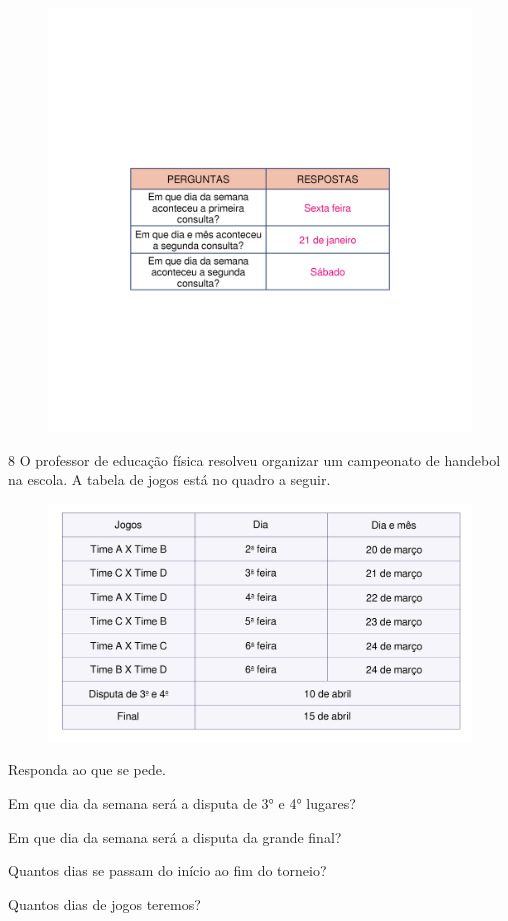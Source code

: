 \begin{figure}[htpb!]
\includegraphics[width=\textwidth]{./media/image53_prof.png}
\end{figure}

\num{8} O professor de educação física resolveu organizar um campeonato de
handebol na escola. A tabela de jogos está no quadro a seguir.

\begin{figure}[htpb!]
\includegraphics[width=.95\textwidth]{./media/image58.png}
\end{figure}

Responda ao que se pede.

\begin{escolha}[itemsep=-5pt]
\item Em que dia da semana será a disputa de 3° e 4° lugares?

\item Em que dia da semana será a disputa da grande final?

\item Quantos dias se passam do início ao fim do torneio?

\item Quantos dias de jogos teremos?
\end{escolha}

